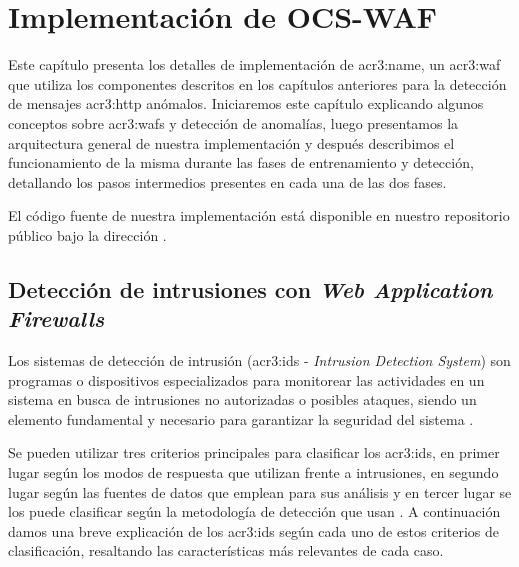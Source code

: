 \renewcommand{\newCommandChapterTitle}{Implementación de OCS-WAF}
\chapter{\newCommandChapterTitle}
\markright{\hfill \thechapter. \newCommandChapterTitle}
\label{chap:p3_new_waf}


Este capítulo presenta los detalles de implementación de \gls{acr3:name},
un \gls{acr3:waf} que utiliza los componentes descritos en los capítulos
anteriores para la detección de mensajes \gls{acr3:http} anómalos.
Iniciaremos este capítulo explicando algunos conceptos sobre \gls{acr3:waf}s
y detección de anomalías, luego presentamos la arquitectura general de
nuestra implementación y después describimos el funcionamiento de la misma
durante las fases de entrenamiento y detección, detallando los pasos
intermedios presentes en cada una de las dos fases.

El código fuente de nuestra implementación está disponible en nuestro
repositorio público bajo la dirección \TheRepoUrl.


\section{Detección de intrusiones con \textit{Web Application Firewalls}}

Los sistemas de detección de intrusión (\gls{acr3:ids} -
\textit{Intrusion Detection System}) son programas o dispositivos
especializados para monitorear las actividades en un sistema en busca
de intrusiones no autorizadas o posibles ataques, siendo un elemento
fundamental y necesario para garantizar la seguridad del sistema
\citep{scarfone2007guide}. %

Se pueden utilizar tres criterios principales para clasificar los
\gls{acr3:ids}, en primer lugar según los modos de respuesta que utilizan
frente a intrusiones, en segundo lugar según las fuentes de datos que
emplean para sus análisis y en tercer lugar se los puede clasificar según
la metodología de detección que usan
\citep{torranoGimenez2015study}. %
A continuación damos una breve explicación de los \gls{acr3:ids} según
cada uno de estos criterios de clasificación, resaltando las características
más relevantes de cada caso.

